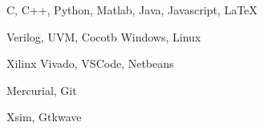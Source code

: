 
\begin{rubric}{}
	C, C++, Python, Matlab, Java, Javascript, \LaTeX\

	Verilog, UVM, Cocotb
	Windows, Linux

	Xilinx Vivado, VSCode, Netbeans

	Mercurial, Git

	Xsim, Gtkwave
\end{rubric}
